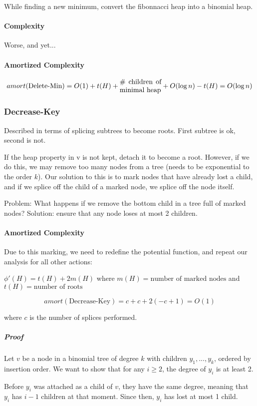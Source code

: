 \documentclass[a4paper]{article}
\begin{document}
While finding a new minimum, convert the fibonnacci heap into a binomial heap.

\paragraph{Complexity}
Worse, and yet...

\paragraph{Amortized Complexity}
\[amort(\text{Delete-Min})=O(1)+t(H)+\parbox{6em}{\# children of minimal heap}+O(\log n)-t(H)=O(\log n)\]

\subsubsection{Decrease-Key}
Described in terms of splicing subtrees to become roots. First subtree is ok, second is not.

If the heap property in v is not kept, detach it to become a root. However, if we do this, we may remove too many nodes from a tree (needs to be exponential to the order $k$). Our solution to this is to mark nodes that have already lost a child, and if we splice off the child of a marked node, we splice off the node itself.

Problem: What happens if we remove the bottom child in a tree full of marked nodes?
Solution: ensure that any node loses at most 2 children.

\paragraph{Amortized Complexity}
Due to this marking, we need to redefine the potential function, and repeat our analysis for all other actions:

$\phi'(H)=t(H)+2m(H)$ where $m(H)=\text{number of marked nodes}$ and $t(H)=\text{number of roots}$

\[amort(\text{Decrease-Key})=c+c+2(-c+1)=O(1)\]

where $c$ is the number of splices performed.

\subparagraph{Proof}
Let $v$ be a node in a binomial tree of degree $k$ with children $y_1,...,y_k$, ordered by insertion order. We want to show that for any $i \ge 2$, the degree of $y_i$ is at least 2.

Before $y_i$ was attached as a child of $v$, they have the same degree, meaning that $y_i$ has $i-1$ children at that moment. Since then, $y_i$ has lost at most 1 child.
\end{document}
